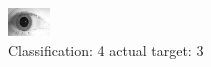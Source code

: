 \begin{figure}[h!]
\begin{center}
\includegraphics[width=0.60\columnwidth]{figures/ID1968_class_4_target_3.png}
\end{center}
\caption{ Classification: 4 actual target: 3}
\label{fig:ID1968_class_4_target_3}
\end{figure}
